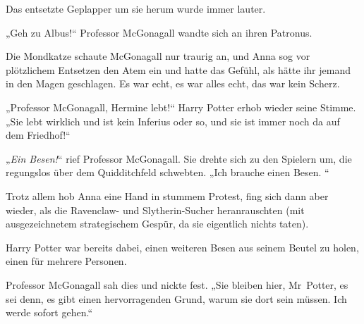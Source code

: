 Das entsetzte Geplapper um sie herum wurde immer lauter.

„Geh zu Albus!“
Professor McGonagall wandte sich an ihren Patronus.

Die Mondkatze schaute McGonagall nur traurig an, und Anna sog vor plötzlichem Entsetzen den Atem ein und hatte das Gefühl, als hätte ihr jemand in den Magen geschlagen. Es war echt, es war alles echt, das war kein Scherz.

„Professor McGonagall, Hermine lebt!“
Harry Potter erhob wieder seine Stimme.
„Sie lebt wirklich und ist kein Inferius oder so, und sie ist immer noch da auf dem Friedhof!“

„\emph{Ein Besen!}“ rief Professor McGonagall.
Sie drehte sich zu den Spielern um, die regungslos über dem Quidditchfeld schwebten.
„Ich brauche einen Besen. “

Trotz allem hob Anna eine Hand in stummem Protest, fing sich dann aber wieder, als die Ravenclaw- und Slytherin-Sucher heranrauschten (mit ausgezeichnetem strategischem Gespür, da sie eigentlich nichts taten).

Harry Potter war bereits dabei, einen weiteren Besen aus seinem Beutel zu holen, einen für mehrere Personen.

Professor McGonagall sah dies und nickte fest.
„Sie bleiben hier, Mr~Potter, es sei denn, es gibt einen hervorragenden Grund, warum sie dort sein müssen. Ich werde sofort gehen.“

